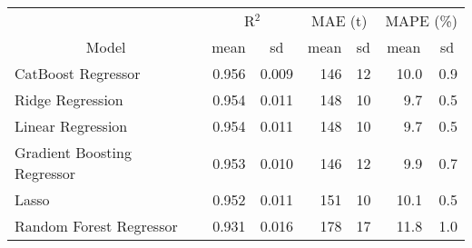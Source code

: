 
\begin{tabular}[t]{lrrrrrr}
\toprule
\multicolumn{1}{c}{ } & \multicolumn{2}{c}{R$^2$} & \multicolumn{2}{c}{MAE (t)} & \multicolumn{2}{c}{MAPE (\%)} \\
\cmidrule(l{3pt}r{3pt}){2-3} \cmidrule(l{3pt}r{3pt}){4-5} \cmidrule(l{3pt}r{3pt}){6-7}
\multicolumn{1}{c}{Model} & \multicolumn{1}{c}{mean} & \multicolumn{1}{c}{sd} & \multicolumn{1}{c}{mean} & \multicolumn{1}{c}{sd} & \multicolumn{1}{c}{mean} & \multicolumn{1}{c}{sd}\\
\midrule
CatBoost Regressor & 0.956 & 0.009 & 146 & 12 & 10.0 & 0.9\\
Ridge Regression & 0.954 & 0.011 & 148 & 10 & 9.7 & 0.5\\
Linear Regression & 0.954 & 0.011 & 148 & 10 & 9.7 & 0.5\\
Gradient Boosting Regressor & 0.953 & 0.010 & 146 & 12 & 9.9 & 0.7\\
Lasso & 0.952 & 0.011 & 151 & 10 & 10.1 & 0.5\\
Random Forest Regressor & 0.931 & 0.016 & 178 & 17 & 11.8 & 1.0\\
\bottomrule
\end{tabular}
